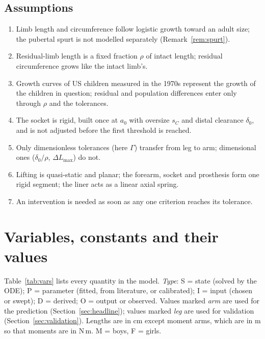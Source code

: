 \documentclass[11pt]{article}
\theoremstyle{definition}
\begin{document}
\subsection{Assumptions}
\label{sec:assumptions}
\begin{enumerate}[label=\textbf{A\arabic*.},ref=A\arabic*,leftmargin=2.6em,itemsep=1pt]
\item \label{as:logistic} Limb length and circumference follow logistic growth toward an adult size; the pubertal spurt is not modelled separately (Remark~\ref{rem:spurt}).
\item \label{as:rho} Residual-limb length is a fixed fraction $\rho$ of intact length; residual circumference grows like the intact limb's.
\item \label{as:snyder} Growth curves of US children measured in the 1970s \cite{snyder1977} represent the growth of the children in question; residual and population differences enter only through $\rho$ and the tolerances.
\item \label{as:socket} The socket is rigid, built once at $a_0$ with oversize $s_C$ and distal clearance $\delta_0$, and is not adjusted before the first threshold is reached.
\item \label{as:transfer} Only dimensionless tolerances (here $\Gamma$) transfer from leg to arm; dimensional ones ($\delta_0/\rho$, $\Delta L_{\max}$) do not.
\item \label{as:statics} Lifting is quasi-static and planar; the forearm, socket and prosthesis form one rigid segment; the liner acts as a linear axial spring.
\item \label{as:trigger} An intervention is needed as soon as any one criterion reaches its tolerance.
\end{enumerate}

\section{Variables, constants and their values}
\label{sec:vars}
Table~\ref{tab:vars} lists every quantity in the model. \emph{Type}: S = state (solved by the ODE); P = parameter (fitted, from literature, or calibrated); I = input (chosen or swept); D = derived; O = output or observed. Values marked \emph{arm} are used for the prediction (Section~\ref{sec:headline}); values marked \emph{leg} are used for validation (Section~\ref{sec:validation}). Lengths are in cm except moment arms, which are in m so that moments are in N\,m. M = boys, F = girls.
\end{document}
